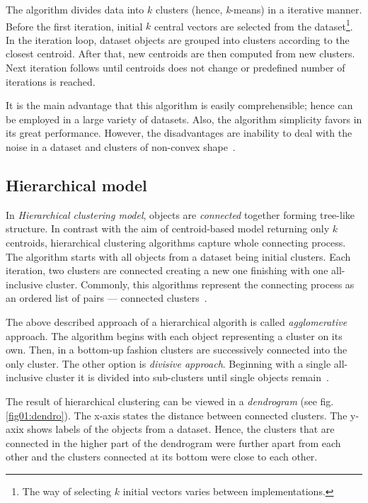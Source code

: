 The algorithm divides data into $k$ clusters (hence, \emph{k}-means) in a iterative manner. Before the first iteration, initial $k$ central vectors are selected from the dataset\footnote{The way of selecting $k$ initial vectors varies between 
implementations.}. In the iteration loop, dataset objects are grouped into clusters according to the closest centroid. After that, new centroids are then computed from new clusters. Next iteration follows until centroids does not change or predefined number of iterations is reached. 

It is the main advantage that this algorithm is easily comprehensible; hence can be employed in a large variety of datasets. Also, the algorithm simplicity favors in its great performance. However, the disadvantages are inability to deal with the noise in a dataset and clusters of non-convex shape~\cite{uppada2014centroid}.
  

\subsection{Hierarchical model}

In \emph{Hierarchical clustering model}, objects are \emph{connected} together forming tree-like structure. In contrast with the aim of centroid-based model returning only $k$ centroids, hierarchical clustering algorithms capture whole connecting process. The algorithm starts with all objects from a dataset being initial clusters. Each iteration, two clusters are connected creating a new one finishing with one all-inclusive cluster. Commonly, this algorithms represent the connecting process as an ordered list of pairs --- connected clusters~\cite{karypis1999chameleon}.

The above described approach of a hierarchical algorith is called \emph{agglomerative} approach. The algorithm begins with each object representing a cluster on its own. Then, in a bottom-up fashion clusters are successively connected into the only cluster. The other option is \emph{divisive approach}. Beginning with a single all-inclusive cluster it is divided into sub-clusters until single objects remain~\cite{rokach2005clustering}. 

The result of hierarchical clustering can be viewed in a \emph{dendrogram} (see fig. \ref{fig01:dendro}). The x-axis states the distance between connected clusters. The y-axix shows labels of the objects from a dataset. Hence, the clusters that are connected in the higher part of the dendrogram were further apart from each other and the clusters connected at its bottom were close to each other.

